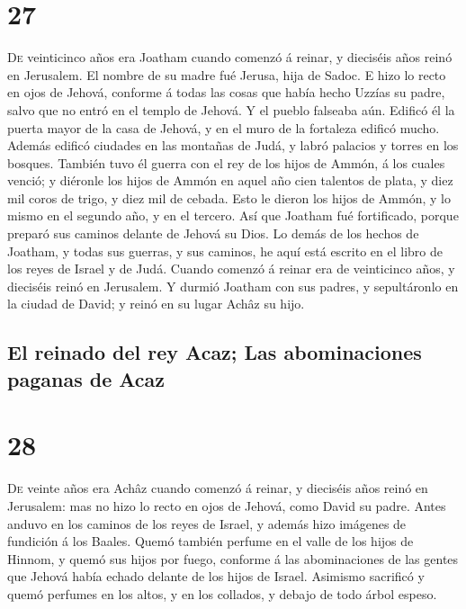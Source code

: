 \hypertarget{section-14-27}{%
\section{27}\label{section-14-27}}

 \textsc{De} veinticinco años era Joatham cuando comenzó á
reinar, y dieciséis años reinó en Jerusalem. El nombre de su madre fué
Jerusa, hija de Sadoc.  E hizo lo recto en ojos de Jehová,
conforme á todas las cosas que había hecho Uzzías su padre, salvo que no
entró en el templo de Jehová. Y el pueblo falseaba aún. 
Edificó él la puerta mayor de la casa de Jehová, y en el muro de la
fortaleza edificó mucho.  Además edificó ciudades en las
montañas de Judá, y labró palacios y torres en los bosques.
 También tuvo él guerra con el rey de los hijos de Ammón,
á los cuales venció; y diéronle los hijos de Ammón en aquel año cien
talentos de plata, y diez mil coros de trigo, y diez mil de cebada. Esto
le dieron los hijos de Ammón, y lo mismo en el segundo año, y en el
tercero.  Así que Joatham fué fortificado, porque preparó
sus caminos delante de Jehová su Dios.  Lo demás de los
hechos de Joatham, y todas sus guerras, y sus caminos, he aquí está
escrito en el libro de los reyes de Israel y de Judá. 
Cuando comenzó á reinar era de veinticinco años, y dieciséis reinó en
Jerusalem.  Y durmió Joatham con sus padres, y
sepultáronlo en la ciudad de David; y reinó en su lugar Achâz su hijo.

\hypertarget{el-reinado-del-rey-acaz-las-abominaciones-paganas-de-acaz}{%
\subsection{El reinado del rey Acaz; Las abominaciones paganas de
Acaz}\label{el-reinado-del-rey-acaz-las-abominaciones-paganas-de-acaz}}

\hypertarget{section-14-28}{%
\section{28}\label{section-14-28}}

 \textsc{De} veinte años era Achâz cuando comenzó á
reinar, y dieciséis años reinó en Jerusalem: mas no hizo lo recto en
ojos de Jehová, como David su padre.  Antes anduvo en los
caminos de los reyes de Israel, y además hizo imágenes de fundición á
los Baales.  Quemó también perfume en el valle de los
hijos de Hinnom, y quemó sus hijos por fuego, conforme á las
abominaciones de las gentes que Jehová había echado delante de los hijos
de Israel.  Asimismo sacrificó y quemó perfumes en los
altos, y en los collados, y debajo de todo árbol espeso.

